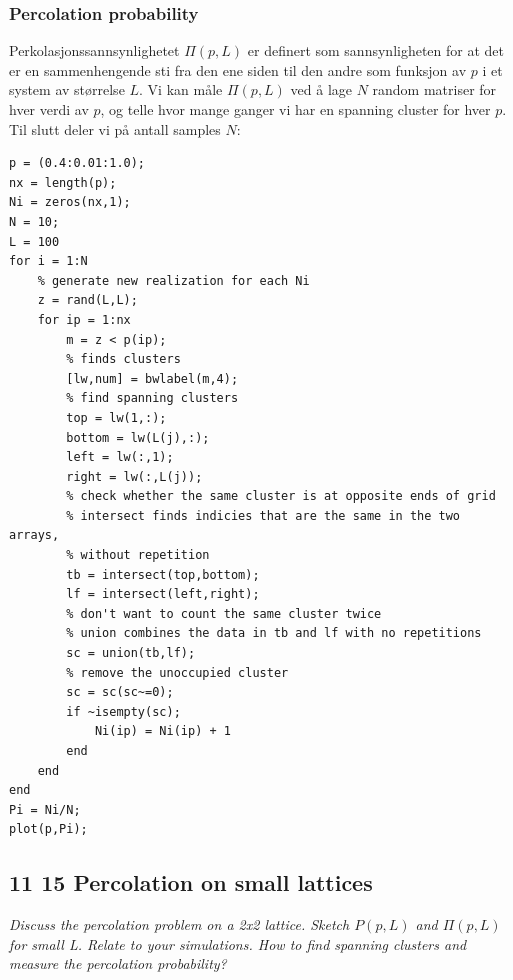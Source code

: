 \documentclass[english, a4paper]{article}
\begin{document}
\subsubsection{Percolation probability}
Perkolasjonssannsynlighetet $\Pi(p,L)$ er definert som sannsynligheten for at det er en 
sammenhengende sti fra den ene siden til den andre som funksjon av $p$ i et system av størrelse $L$. 
Vi kan måle $\Pi(p,L)$ ved å lage $N$ random matriser for hver verdi av $p$, og telle hvor mange ganger vi 
har en spanning cluster for hver $p$. Til slutt deler vi på antall samples $N$:
\begin{lstlisting}
p = (0.4:0.01:1.0);
nx = length(p);
Ni = zeros(nx,1);
N = 10;
L = 100
for i = 1:N
    % generate new realization for each Ni
    z = rand(L,L);
    for ip = 1:nx
        m = z < p(ip);
        % finds clusters
        [lw,num] = bwlabel(m,4);
        % find spanning clusters
        top = lw(1,:);
        bottom = lw(L(j),:);
        left = lw(:,1);
        right = lw(:,L(j));
        % check whether the same cluster is at opposite ends of grid
        % intersect finds indicies that are the same in the two arrays,
        % without repetition
        tb = intersect(top,bottom);
        lf = intersect(left,right);
        % don't want to count the same cluster twice
        % union combines the data in tb and lf with no repetitions
        sc = union(tb,lf);
        % remove the unoccupied cluster
        sc = sc(sc~=0);
        if ~isempty(sc);
            Ni(ip) = Ni(ip) + 1
        end
    end
end
Pi = Ni/N;
plot(p,Pi);
\end{lstlisting}


\subsection{11 15 Percolation on small lattices}
\textit{Discuss the percolation problem on a 2x2 lattice. Sketch $P(p,L)$ and $\Pi(p,L)$ for small L.
Relate to your simulations. How to find spanning clusters and measure the percolation probability?} \\
\end{document}
